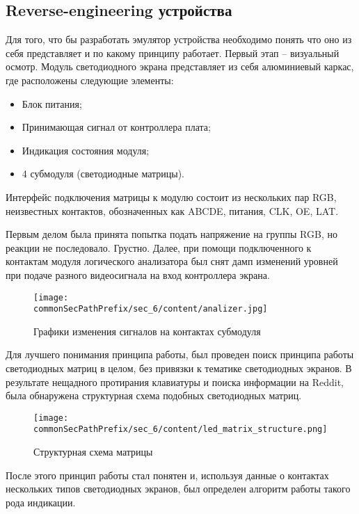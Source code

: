\subsection{Reverse-engineering устройства}

Для того, что бы разработать эмулятор устройства необходимо понять что оно из себя представляет и по какому принципу работает. Первый этап -- визуальный осмотр. Модуль светодиодного экрана представляет из себя алюминиевый каркас, где расположены следующие элементы:
\begin{itemize}
    \item Блок питания;
    \item Принимающая сигнал от контроллера плата;
    \item Индикация состояния модуля;
    \item 4 субмодуля (светодиодные матрицы).
\end{itemize}

Интерфейс подключения матрицы к модулю состоит из нескольких пар RGB, неизвестных контактов, обозначенных как ABCDE, питания, CLK, OE, LAT.

Первым делом была принята попытка подать напряжение на группы RGB, но реакции не последовало. Грустно. Далее, при помощи подключенного к контактам модуля логического анализатора был снят дамп изменений уровней при подаче разного видеосигнала на вход контроллера экрана.
\begin{figure}[ht]
    \centering
    \texttt{[image: \\commonSecPathPrefix/sec\_6/content/analizer.jpg]}
    \caption{Графики изменения сигналов на контактах субмодуля}
\end{figure}

Для лучшего понимания принципа работы, был проведен поиск принципа работы светодиодных матриц в целом, без привязки к тематике светодиодных экранов. В результате нещадного протирания клавиатуры и поиска информации на Reddit\cite{reddit}, была обнаружена структурная схема подобных светодиодных матриц.

\begin{figure}[ht]
    \centering
    \texttt{[image: \\commonSecPathPrefix/sec\_6/content/led\_matrix\_structure.png]}
    \caption{Структурная схема матрицы}
\end{figure}

После этого принцип работы стал понятен и, используя данные о контактах нескольких типов светодиодных экранов, был определен алгоритм работы такого рода индикации.
